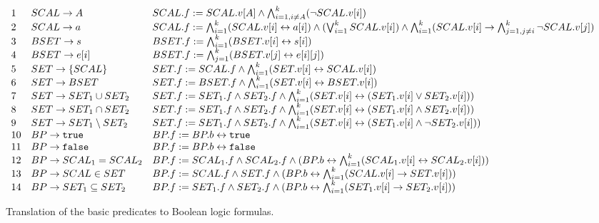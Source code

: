 \begin{figure*}[t]
\[
\begin{array}{lll}
1 & SCAL \rightarrow  A &
        SCAL.f := SCAL.v[A]
        \wedge \bigwedge_{i=1, i \neq A}^k (\neg SCAL.v[i]) \\
2 & SCAL \rightarrow  a &
        SCAL.f := \bigwedge_{i=1}^k (SCAL.v[i] \leftrightarrow a[i])
        \wedge (\bigvee_{i=1}^k SCAL.v[i]) \wedge \bigwedge_{i=1}^k
        (SCAL.v[i] \rightarrow \bigwedge_{j=1,j\neq i}^k \neg SCAL.v[j])  \\
3 & BSET \rightarrow  s &
        BSET.f := \bigwedge_{i=1}^k (BSET.v[i] \leftrightarrow s[i]) \\
4 & BSET \rightarrow  e[i] &
        BSET.f := \bigwedge_{j=1}^k (BSET.v[j] \leftrightarrow e[i][j]) \\
5 & SET  \rightarrow  \{ SCAL \} &
        SET.f := SCAL.f \wedge \bigwedge_{i=1}^k (SET.v[i] \leftrightarrow SCAL.v[i]) \\
6 & SET  \rightarrow  BSET &
        SET.f := BSET.f \wedge \bigwedge_{i=1}^k (SET.v[i] \leftrightarrow BSET.v[i]) \\
7 & SET  \rightarrow  SET_1 \cup SET_2 &
        SET.f := SET_1.f \wedge SET_2.f \wedge
        \bigwedge_{i=1}^k (SET.v[i] \leftrightarrow (SET_1.v[i] \vee SET_2.v[i])) \\
8 & SET  \rightarrow SET_1 \cap SET_2 &
        SET.f := SET_1.f \wedge SET_2.f \wedge
        \bigwedge_{i=1}^k (SET.v[i] \leftrightarrow (SET_1.v[i] \wedge SET_2.v[i])) \\
9 & SET  \rightarrow SET_1 \setminus SET_2 &
        SET.f := SET_1.f \wedge SET_2.f \wedge
        \bigwedge_{i=1}^k (SET.v[i] \leftrightarrow (SET_1.v[i] \wedge \neg SET_2.v[i])) \\
10 & BP \rightarrow  \texttt{true} &
        BP.f := BP.b \leftrightarrow \texttt{true} \\
11 & BP \rightarrow  \texttt{false} &
        BP.f := BP.b \leftrightarrow \texttt{false} \\
12 & BP \rightarrow  SCAL_1 = SCAL_2 &
        BP.f := SCAL_1.f \wedge SCAL_2.f \wedge
        (BP.b \leftrightarrow \bigwedge_{i=1}^k (SCAL_1.v[i] \leftrightarrow SCAL_2.v[i])) \\
13 & BP \rightarrow  SCAL \in SET &
        BP.f := SCAL.f \wedge SET.f \wedge
        (BP.b \leftrightarrow \bigwedge_{i=1}^k (SCAL.v[i] \rightarrow SET.v[i])) \\
14 & BP \rightarrow  SET_1 \subseteq SET_2 &
        BP.f := SET_1.f \wedge SET_2.f \wedge
        (BP.b \leftrightarrow \bigwedge_{i=1}^k (SET_1.v[i] \rightarrow SET_2.v[i]))
\end{array}
\]
\caption{Translation of the basic predicates to Boolean logic formulas.}
\label{fig:BP}
\end{figure*}

